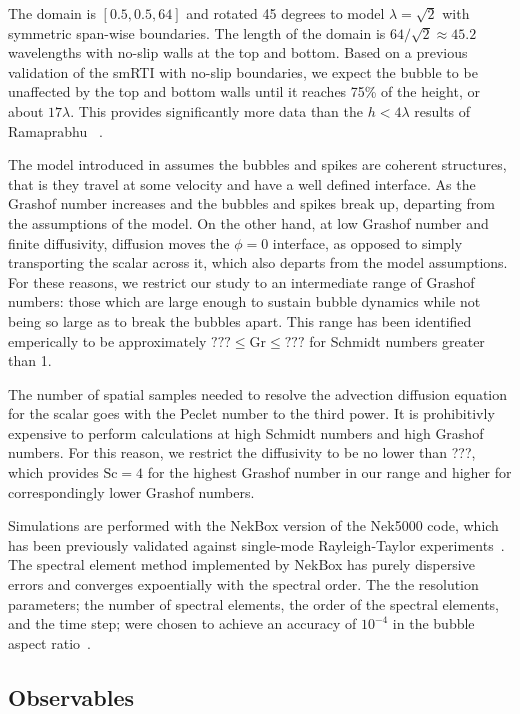 The domain is $\left[0.5, 0.5, 64\right]$ and rotated 45 degrees to model $\lambda = \sqrt{2}$ with symmetric span-wise boundaries.
The length of the domain is $64/\sqrt{2} \approx 45.2$ wavelengths with no-slip walls at the top and bottom.
Based on a previous validation of the smRTI with no-slip boundaries, we expect the bubble to be unaffected by the top and bottom walls until it reaches 75\% of the height, or about $17\lambda$.
This provides significantly more data than the $h < 4 \lambda$ results of Ramaprabhu \etal~\cite{Ramaprabhu2012}.

The model introduced in  assumes the bubbles and spikes are coherent structures, that is they travel at some velocity and have a well defined interface.
As the Grashof number increases and the bubbles and spikes break up, departing from the assumptions of the model.
On the other hand, at low Grashof number and finite diffusivity, diffusion moves the $\phi = 0$ interface, as opposed to simply transporting the scalar across it, which also departs from the model assumptions.
For these reasons, we restrict our study to an intermediate range of Grashof numbers: those which are large enough to sustain bubble dynamics while not being so large as to break the bubbles apart.
This range has been identified emperically to be approximately $??? \le \text{Gr} \le ???$ for Schmidt numbers greater than 1.

The number of spatial samples needed to resolve the advection diffusion equation for the scalar goes with the Peclet number to the third power.
It is prohibitivly expensive to perform calculations at high Schmidt numbers and high Grashof numbers.  
For this reason, we restrict the diffusivity to be no lower than ???, which provides $\text{Sc} = 4$ for the highest Grashof number in our range and higher for correspondingly lower Grashof numbers.

Simulations are performed with the NekBox version of the Nek5000 code, which has been previously validated against single-mode Rayleigh-Taylor experiments~\cite{Validation2016,Wilkinson2007}.
The spectral element method implemented by NekBox has purely dispersive errors and converges expoentially with the spectral order.
The the resolution parameters; the number of spectral elements, the order of the spectral elements, and the time step; were chosen to achieve an accuracy of $10^{-4}$ in the bubble aspect ratio~\cite{Convergence2016}.

\subsection{Observables}

